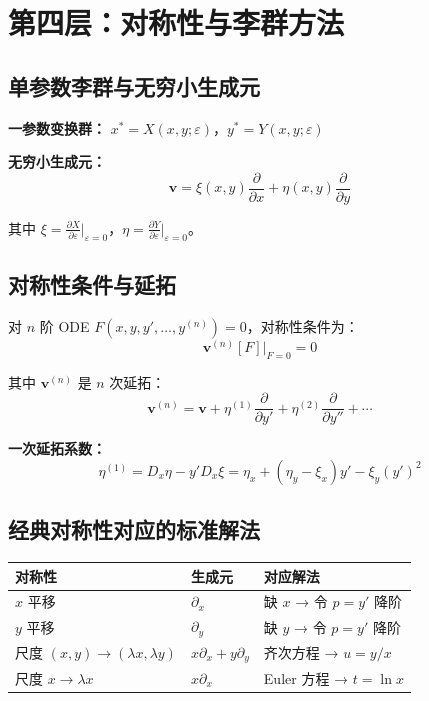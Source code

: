 \section{第四层：对称性与李群方法}

\subsection{单参数李群与无穷小生成元}

\textbf{一参数变换群：} $x^* = X(x,y;\varepsilon)$，$y^* = Y(x,y;\varepsilon)$

\textbf{无穷小生成元：}
\[
\mathbf{v} = \xi(x,y)\frac{\partial}{\partial x} + \eta(x,y)\frac{\partial}{\partial y}
\]

其中 $\xi = \frac{\partial X}{\partial \varepsilon}\big|_{\varepsilon=0}$，$\eta = \frac{\partial Y}{\partial \varepsilon}\big|_{\varepsilon=0}$。

\subsection{对称性条件与延拓}

对 $n$ 阶 ODE $F(x, y, y', \ldots, y^{(n)}) = 0$，对称性条件为：
\[
\mathbf{v}^{(n)}[F]\big|_{F=0} = 0
\]

其中 $\mathbf{v}^{(n)}$ 是 $n$ 次延拓：
\[
\mathbf{v}^{(n)} = \mathbf{v} + \eta^{(1)}\frac{\partial}{\partial y'} + \eta^{(2)}\frac{\partial}{\partial y''} + \cdots
\]

\textbf{一次延拓系数：}
\[
\eta^{(1)} = D_x\eta - y'D_x\xi = \eta_x + (\eta_y - \xi_x)y' - \xi_y(y')^2
\]

\subsection{经典对称性对应的标准解法}

\begin{center}
\begin{tabular}{L{4cm}L{3.5cm}L{4cm}}
\toprule
\textbf{对称性} & \textbf{生成元} & \textbf{对应解法} \\
\midrule
$x$ 平移 & $\partial_x$ & 缺 $x$ → 令 $p = y'$ 降阶 \\
$y$ 平移 & $\partial_y$ & 缺 $y$ → 令 $p = y'$ 降阶 \\
尺度 $(x,y)\to(\lambda x, \lambda y)$ & $x\partial_x + y\partial_y$ & 齐次方程 → $u = y/x$ \\
尺度 $x \to \lambda x$ & $x\partial_x$ & Euler 方程 → $t = \ln x$ \\
\bottomrule
\end{tabular}
\end{center}

